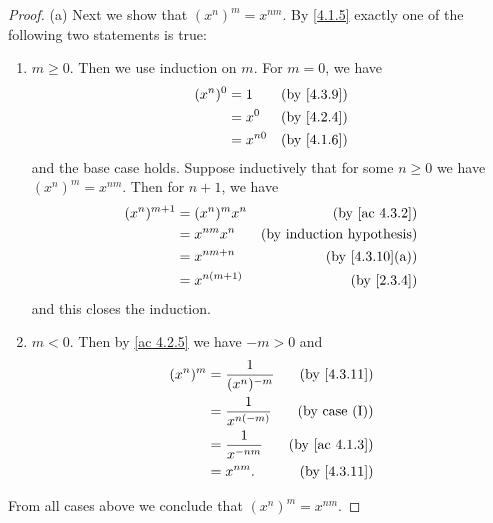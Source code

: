 \begin{proof}{(a)}
  Next we show that \((x^n)^m = x^{nm}\).
  By \cref{4.1.5} exactly one of the following two statements is true:
  \begin{enumerate}[label=(\Roman*)]
    \item \(m \geq 0\).
          Then we use induction on \(m\).
          For \(m = 0\), we have
          \begin{align*}
            (x^n)^0 & = 1      & \text{(by \cref{4.3.9})} \\
                    & = x^0    & \text{(by \cref{4.2.4})} \\
                    & = x^{n0} & \text{(by \cref{4.1.6})}
          \end{align*}
          and the base case holds.
          Suppose inductively that for some \(n \geq 0\) we have \((x^n)^m = x^{nm}\).
          Then for \(n + 1\), we have
          \begin{align*}
            (x^n)^{m + 1} & = (x^n)^m x^n  & \text{(by \cref{ac 4.3.2})}      \\
                          & = x^{nm} x^n   & \text{(by induction hypothesis)} \\
                          & = x^{nm + n}   & \text{(by \cref{4.3.10}(a))}     \\
                          & = x^{n(m + 1)} & \text{(by \cref{2.3.4})}
          \end{align*}
          and this closes the induction.
    \item \(m < 0\).
          Then by \cref{ac 4.2.5} we have \(-m > 0\) and
          \begin{align*}
            (x^n)^m & = \frac{1}{(x^n)^{-m}} & \text{(by \cref{4.3.11})}   \\
                    & = \frac{1}{x^{n(-m)}}  & \text{(by case (I))}        \\
                    & = \frac{1}{x^{-nm}}    & \text{(by \cref{ac 4.1.3})} \\
                    & = x^{nm}.              & \text{(by \cref{4.3.11})}
          \end{align*}
  \end{enumerate}
  From all cases above we conclude that \((x^n)^m = x^{nm}\).


\end{proof}
